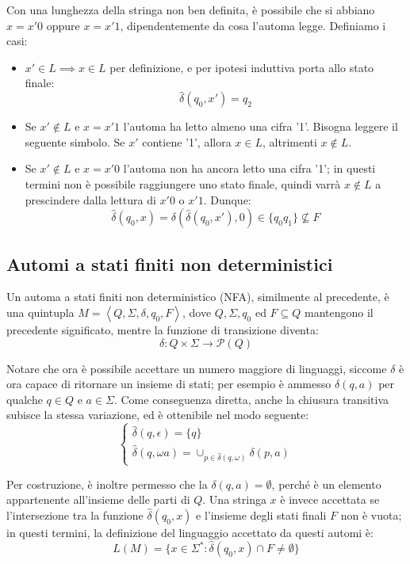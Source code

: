 \noindent Con una lunghezza della stringa non ben definita, è possibile che si abbiano $x = x'0$ oppure $x = x'1$, dipendentemente da cosa l'automa
legge. Definiamo i casi: \begin{itemize}
    \item $x'\in L \implies x\in L$ per definizione, e per ipotesi induttiva porta allo stato finale: \[
        \hat{\delta}(q_0, x') = q_2
    \]
    \item Se $x'\notin L$ e $x = x'1$ l'automa ha letto almeno una cifra '1'. Bisogna leggere il seguente simbolo. Se $x'$ contiene '1', allora $x\in L$,
	altrimenti $x\notin L$.
    \item Se $x'\notin L$ e $x = x'0$ l'automa non ha ancora letto una cifra '1'; in questi termini non è possibile raggiungere uno stato finale, quindi
	varrà $x\notin L$ a prescindere dalla lettura di $x'0$ o $x'1$. Dunque: \[
        \hat{\delta}(q_0, x) = \delta(\hat{\delta}(q_0, x'), 0) \in \{q_0q_1\}\nsubseteq F
    \]
\end{itemize}

\subsection{Automi a stati finiti non deterministici}
Un automa a stati finiti non deterministico (NFA), similmente al precedente, è una quintupla $M = \left<Q, \Sigma, \delta, q_0, F\right>$, dove $Q,
\Sigma, q_0$ ed $F\subseteq Q$ mantengono il precedente significato, mentre la funzione di transizione diventa: \[
    \delta : Q\times \Sigma \to \mathcal{P}(Q)
\]

\noindent Notare che ora è possibile accettare un numero maggiore di linguaggi, siccome $\delta$ è ora capace di ritornare un insieme di stati; per
esempio è ammesso $\delta(q, a)$ per qualche $q\in Q$ e $a\in \Sigma$. Come conseguenza diretta, anche la chiusura transitiva subisce la stessa
variazione, ed è ottenibile nel modo seguente: \[ \begin{cases}
    \hat{\delta}(q, \epsilon) = \{q\}\\
    \hat{\delta}(q, \omega a) = \cup_{p\in \hat{\delta}(q,\omega)}\delta(p,a)
\end{cases} \]

\noindent Per costruzione, è inoltre permesso che la $\delta(q, a) = \emptyset$, perché è un elemento appartenente all'insieme delle parti di $Q$. Una
stringa $x$ è invece accettata se l'intersezione tra la funzione $\hat{\delta}(q_0, x)$ e l'insieme degli stati finali $F$ non è vuota; in questi
termini, la definizione del linguaggio accettato da questi automi è: \[
    L(M) = \{x\in \Sigma^* : \hat{\delta}(q_0, x) \cap F \neq \emptyset\}
\]


